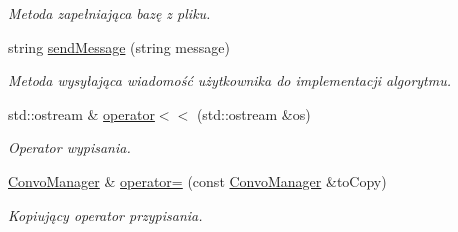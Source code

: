 \begin{DoxyCompactItemize}
$$\begin{DoxyCompactList}\small\item\em Metoda zapełniająca bazę z pliku. \end{DoxyCompactList}\item 
string \mbox{\hyperlink{class_convo_manager_ab748892188c5b958497203bd6876861b}{send\+Message}} (string message)
\begin{DoxyCompactList}\small\item\em Metoda wysyłająca wiadomość użytkownika do implementacji algorytmu. \end{DoxyCompactList}\item 
\mbox{\label{class_convo_manager_ab490272e7e0e0bb146bdcf59e1f0a2e4}} 
std\+::ostream \& \mbox{\hyperlink{class_convo_manager_ab490272e7e0e0bb146bdcf59e1f0a2e4}{operator$<$$<$}} (std\+::ostream \&os)
\begin{DoxyCompactList}\small\item\em Operator wypisania. \end{DoxyCompactList}\item 
\mbox{\label{class_convo_manager_a6f13501ea97fa9f7a0da310e11d0a0ca}} 
\mbox{\hyperlink{class_convo_manager}{Convo\+Manager}} \& \mbox{\hyperlink{class_convo_manager_a6f13501ea97fa9f7a0da310e11d0a0ca}{operator=}} (const \mbox{\hyperlink{class_convo_manager}{Convo\+Manager}} \&to\+Copy)
\begin{DoxyCompactList}\small\item\em Kopiujący operator przypisania. \end{DoxyCompactList}\end{DoxyCompactItemize}
